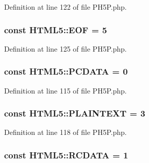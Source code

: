 Definition at line 122 of file P\+H5\+P.\+php.

\hypertarget{classHTML5_a1cf386934bc9b550f918a596e668f9c1}{
\subsubsection[{E\+O\+F}]{\setlength{\rightskip}{0pt plus 5cm}const H\+T\+M\+L5\+::\+E\+O\+F = 5}}\label{classHTML5_a1cf386934bc9b550f918a596e668f9c1}


Definition at line 125 of file P\+H5\+P.\+php.

\hypertarget{classHTML5_a01abf67d982563ea48ab1a966dfa6ed5}{
\subsubsection[{P\+C\+D\+A\+T\+A}]{\setlength{\rightskip}{0pt plus 5cm}const H\+T\+M\+L5\+::\+P\+C\+D\+A\+T\+A = 0}}\label{classHTML5_a01abf67d982563ea48ab1a966dfa6ed5}


Definition at line 115 of file P\+H5\+P.\+php.

\hypertarget{classHTML5_afa0753128f661db20e6ce76aaf642a7d}{
\subsubsection[{P\+L\+A\+I\+N\+T\+E\+X\+T}]{\setlength{\rightskip}{0pt plus 5cm}const H\+T\+M\+L5\+::\+P\+L\+A\+I\+N\+T\+E\+X\+T = 3}}\label{classHTML5_afa0753128f661db20e6ce76aaf642a7d}


Definition at line 118 of file P\+H5\+P.\+php.

\hypertarget{classHTML5_a520a3576293ae3cb17f4e8c20e594597}{
\subsubsection[{R\+C\+D\+A\+T\+A}]{\setlength{\rightskip}{0pt plus 5cm}const H\+T\+M\+L5\+::\+R\+C\+D\+A\+T\+A = 1}}\label{classHTML5_a520a3576293ae3cb17f4e8c20e594597}


